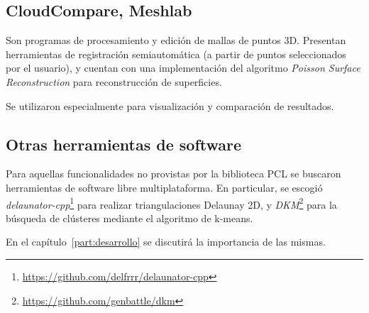	\subsection{CloudCompare, Meshlab}
	Son programas de procesamiento y edición de mallas de puntos 3D.  Presentan
	herramientas de registración semiautomática (a partir de puntos
	seleccionados por el usuario), y cuentan con una implementación del
	algoritmo \emph{Poisson Surface Reconstruction} para reconstrucción de
	superficies\cite{LocalChapterEvents:ItalChap:ItalianChapConf2008:129-136}.

	Se utilizaron especialmente para visualización y comparación de resultados.

	\subsection{Otras herramientas de software}
	Para aquellas funcionalidades no provistas por la biblioteca PCL se buscaron herramientas de software libre multiplataforma.
	En particular, se escogió \emph{delaunator-cpp}\footnote{\url{https://github.com/delfrrr/delaunator-cpp}} para realizar triangulaciones Delaunay 2D,
	y \emph{DKM}\footnote{\url{https://github.com/genbattle/dkm}} para la búsqueda de clústeres mediante el algoritmo de k-means.

    En el capítulo~\ref{part:desarrollo} se discutirá la importancia de las mismas.
